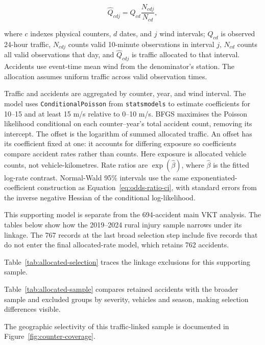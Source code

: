 \begin{equation}
\label{eq:allocated-counter-traffic}
\widehat Q_{cdj}=Q_{cd}\frac{N_{cdj}}{N_{cd}},
\end{equation}

where \(c\) indexes physical counters, \(d\) dates, and \(j\) wind intervals;
\(Q_{cd}\) is observed 24-hour traffic, \(N_{cdj}\) counts valid 10-minute
observations in interval \(j\), \(N_{cd}\) counts all valid observations that
day, and \(\widehat Q_{cdj}\) is traffic allocated to that interval.
Accidents use event-time mean wind from the denominator's station.
The allocation assumes uniform traffic across valid observation times.

Traffic and accidents are aggregated by counter, year, and wind interval.
The model uses \texttt{ConditionalPoisson} from \texttt{statsmodels} to estimate
coefficients for
10--15 and at least 15 m/s relative to 0--10 m/s. BFGS maximises the Poisson
likelihood conditional on each counter--year's total accident count, removing
its intercept. The offset is the logarithm of summed allocated traffic. An offset has its
coefficient fixed at one: it accounts for differing exposure so coefficients
compare accident rates rather than counts. Here exposure is allocated vehicle
counts, not vehicle-kilometres. Rate ratios are \(\exp(\widehat\beta)\), where
\(\widehat\beta\) is the fitted log-rate contrast. Normal-Wald 95\% intervals
use the same exponentiated-coefficient construction as
Equation~\ref{eq:odds-ratio-ci}, with standard errors from the inverse negative
Hessian of the conditional log-likelihood.

This supporting model is separate from the 694-accident main VKT analysis. The
tables below show how the 2019--2024 rural injury sample narrows under its
linkage. The 767 records at the last broad selection step include five records
that do not enter the final allocated-rate model, which retains 762 accidents.

Table~\ref{tab:allocated-selection} traces the linkage exclusions for this
supporting sample.



Table~\ref{tab:allocated-sample} compares retained accidents with the broader
sample and excluded groups by severity, vehicles and season, making selection
differences visible.



The geographic selectivity of this traffic-linked sample is documented in
Figure~\ref{fig:counter-coverage}.

